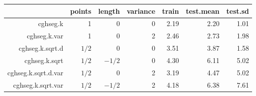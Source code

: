 \begin{tabular}{rrrrrrr}
  \hline
 & points & length & variance & train & test.mean & test.sd \\ 
  \hline
cghseg.k & 1 & 0 & 0 & 2.19 & 2.20 & 1.01 \\ 
  cghseg.k.var & 1 & 0 & 2 & 2.46 & 2.73 & 1.98 \\ 
  cghseg.k.sqrt.d & $1/2$ & 0 & 0 & 3.51 & 3.87 & 1.58 \\ 
  cghseg.k.sqrt & $1/2$ & $-1/2$ & 0 & 4.30 & 6.11 & 5.02 \\ 
  cghseg.k.sqrt.d.var & $1/2$ & 0 & 2 & 3.19 & 4.47 & 5.02 \\ 
  cghseg.k.sqrt.var & $1/2$ & $-1/2$ & 2 & 4.18 & 6.38 & 7.61 \\ 
   \hline
\end{tabular}
